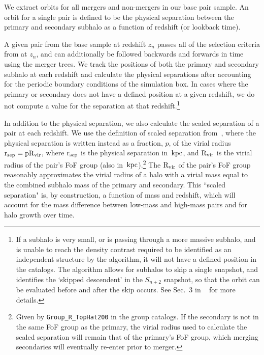 \documentclass[twocolumn,linenumbers]{aastex631}
\newcommand{\chambe}{\citet{Chamberlain2024}}
\begin{document}
We extract orbits for all mergers and non-mergers in our base pair sample. 
An orbit for a single pair is defined to be the physical separation between the primary and secondary subhalo as a function of redshift (or lookback time). 

A given pair from the base sample at redshift $z_n$ passes all of the selection criteria from \chambe{} at $z_n$, and can additionally be followed backwards and forwards in time using the \sublink{} merger trees. 
We track the positions of both the primary and secondary subhalo at each redshift and calculate the physical separations after accounting for the periodic boundary conditions of the simulation box.
In cases where the primary or secondary does not have a defined position at a given redshift, we do not compute a value for the separation at that redshift.\footnote{If a subhalo is very small, or is passing through a more massive subhalo, and is unable to reach the density contrast required to be identified as an independent structure by the \subfind{} algorithm, it will not have a defined position in the \sublink{} catalogs. The \sublink{} algorithm allows for subhalos to skip a single snapshot, and identifies the `skipped descendent' in the $S_{n+2}$ snapshot, so that the orbit can be evaluated before and after the skip occurs. See Sec.~3 in ~\citet{RG2015} for more details.}

In addition to the physical separation, we also calculate the scaled separation of a pair at each redshift. We use the definition of scaled separation from~\cite{Chamberlain2024}, where the physical separation is written instead as a fraction, $p$, of the virial radius $\rm r_{sep}=p\rm R_{vir}$, where $\rm r_{sep}$ is the physical separation in $\mathrm{\,kpc}$, and $\rm R_{vir}$ is the virial radius of the pair's FoF group (also in $\mathrm{\,kpc}$).\footnote{Given by \texttt{Group\_R\_TopHat200} in the group catalogs. If the secondary is not in the same FoF group as the primary, the virial radius used to calculate the scaled separation will remain that of the primary's FoF group, which merging secondaries will eventually re-enter prior to merger.} 
The $\rm R_{vir}$ of the pair's FoF group reasonably approximates the virial radius of a halo with a virial mass equal to the combined subhalo mass of the primary and secondary.
This ``scaled separation" is, by construction, a function of mass and redshift, which will account for the mass difference between low-mass and high-mass pairs and for halo growth over time. 

\end{document}
